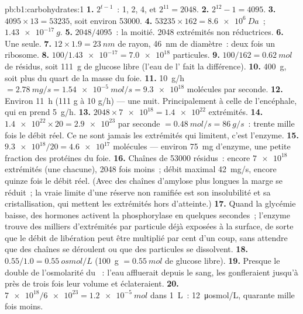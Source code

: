 \begin{solution}{pb:b1:carbohydrates:1}
\textbf{1.} $2^{t-1}$~: 1, 2, 4, et $2^{11} = 2048$.
\textbf{2.} $2^{12} - 1 = 4095$.
\textbf{3.} $4095\times 13 = \num{53235}$, soit environ \num{53000}.
\textbf{4.} $\num{53235}\times 162 = \qty{8.6e6}{Da}$~;
$\qty{1.43e-17}{g}$.
\textbf{5.} $2048/4095$~: la moitié. \num{2048} extrémités non
réductrices.
\textbf{6.} Une seule.
\textbf{7.} $12\times 1.9 = \qty{23}{nm}$ de rayon, \qty{46}{nm} de
diamètre~: deux fois un ribosome.
\textbf{8.} $100/\num{1.43e-17} = \num{7.0e18}$ particules.
\textbf{9.} $100/162 = \qty{0.62}{mol}$ de résidus, soit \qty{111}{g}
de glucose libre (l'eau de l' fait la différence).
\textbf{10.} \qty{400}{g}, soit plus du quart de la masse du foie.
\textbf{11.} \qty{10}{g/h} $= \qty{2.78}{mg/s} = \qty{1.54e-5}{mol/s} =
\num{9.3e18}$ molécules par seconde.
\textbf{12.} Environ \qty{11}{h} (111 g à 10 g/h) --- une nuit.
Principalement à celle de l'encéphale, qui en prend \qty{5}{g/h}.
\textbf{13.} $2048\times\num{7e18} = \num{1.4e22}$ extrémités.
\textbf{14.} $\num{1.4e22}\times 20 = \num{2.9e23}$ par seconde $=
\qty{0.48}{mol/s} = \qty{86}{g/s}$~: trente mille fois le débit réel.
Ce ne sont jamais les extrémités qui limitent, c'est l'enzyme.
\textbf{15.} $\num{9.3e18}/20 = \num{4.6e17}$ molécules --- environ
\qty{75}{mg} d'enzyme, une petite fraction des protéines du foie.
\textbf{16.} Chaînes de \num{53000} résidus~: encore $\num{7e18}$
extrémités (une chacune), \num{2048} fois moins~; débit maximal
\qty{42}{mg/s}, encore quinze fois le débit réel. (Avec des chaînes
d'amylose plus longues la marge se réduit~; la vraie limite d'une
réserve non ramifiée est son insolubilité et sa cristallisation, qui
mettent les extrémités hors d'atteinte.)
\textbf{17.} Quand la glycémie baisse, des hormones activent la
phosphorylase en quelques secondes~; l'enzyme trouve des milliers
d'extrémités par particule déjà exposées à la surface, de sorte que le
débit de libération peut être multiplié par cent d'un coup, sans
attendre que des chaînes se déroulent ou que des particules se
dissolvent.
\textbf{18.} $0.55/1.0 = \qty{0.55}{osmol/L}$ (\qty{100}{g}
$= \qty{0.55}{mol}$ de glucose libre).
\textbf{19.} Presque le double de l'osmolarité du ~: l'eau
affluerait depuis le sang, les  gonfleraient jusqu'à près de
trois fois leur volume et éclateraient.
\textbf{20.} $\num{7e18}/\num{6e23} = \qty{1.2e-5}{mol}$ dans
\qty{1}{L}~: \qty{12}{\micro osmol/L}, quarante mille fois moins.

\end{solution}

